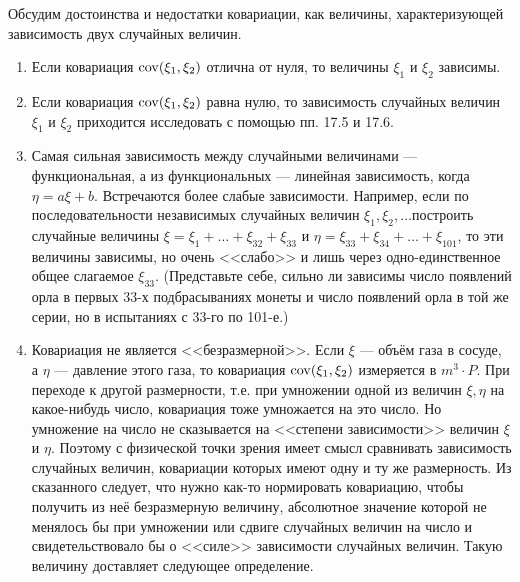 \begin{remark}\label{rem:19.6}
Обсудим достоинства и недостатки ковариации, как
величины, характеризующей зависимость двух случайных величин.
\begin{enumerate}
	\item Если ковариация $\operatorname{cov}(\xi_1, \xi_2)$ отлична от нуля, то величины 
	$\xi_1$ и $\xi_2$ зависимы.
	
	\item Если ковариация $\operatorname{cov}(\xi_1, \xi_2)$ равна нулю, то зависимость случайных
	величин $\xi_1$ и $\xi_2$ приходится исследовать с помощью пп. 17.5 и 17.6.
	
	\item Самая сильная зависимость между случайными величинами — функциональная, а из функциональных — линейная зависимость, когда $\eta =
	a \xi + b$. Встречаются более слабые зависимости. Например, если по последовательности независимых случайных величин $\xi_1, \xi_2, \dots$построить случайные величины $\xi = \xi_1 +\dots + \xi_{32} + \xi_{33}$ и $\eta = \xi_{33} + \xi_{34}+\dots + \xi_{101}$, то эти
	величины зависимы, но очень <<слабо>> и лишь через одно-единственное общее слагаемое $\xi_{33}$. (Представьте себе, сильно ли зависимы число появлений
	орла в первых 33-х подбрасываниях монеты и число появлений орла в той
	же серии, но в испытаниях с 33-го по 101-е.)

	\item Ковариация не является <<безразмерной>>. Если $\xi$ — объём газа в сосуде, а $\eta$ — давление этого газа, то ковариация $\operatorname{cov}(\xi_1, \xi_2)$ измеряется в $ m^3 \cdot P $. При переходе к другой размерности, т.е. при умножении одной из величин $\xi, \eta$ на какое-нибудь число, ковариация тоже умножается на это число. Но умножение на число не сказывается на <<степени зависимости>> величин $\xi$ и $\eta$. Поэтому с физической точки зрения имеет смысл сравнивать зависимость случайных величин, ковариации которых имеют одну и ту же размерность.
	Из сказанного следует, что нужно как-то нормировать ковариацию,
	чтобы получить из неё безразмерную величину, абсолютное значение которой не менялось бы при умножении или сдвиге случайных величин на число и свидетельствовало бы о <<силе>> зависимости случайных величин.
	Такую величину доставляет следующее определение.
\end{enumerate}
\end{remark}

